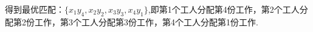 \begin{example}
得到最优匹配：$\{x_1y_4,x_2y_2,x_3y_3, x_4y_1\}$,即第1个工人分配第4份工作，第2个工人分配第2份工作，第3个工人分配第3份工作，第4个工人分配第1份工作.





\end{example}









